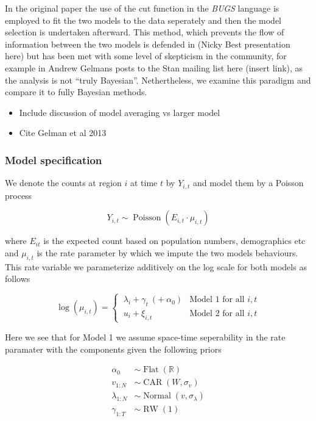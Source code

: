 \documentclass{report}
\begin{document}
In the original paper \cite{baystdetect} the use of the cut function in the \emph{BUGS} language is employed to fit the two models to the data seperately and then the model selection is undertaken afterward. This method, which prevents the flow of information between the two models is defended in (Nicky Best presentation here) but has been met with some level of skepticism in the community, for example in Andrew Gelmans posts to the Stan mailing list here (insert link), as the analysis is not ``truly Bayesian''. Nethertheless, we examine this paradigm and compare it to fully Bayesian methods. 

\begin{itemize}
\item Include discussion of model averaging vs larger model
\item Cite Gelman et al 2013
\end{itemize}

\subsubsection{Model specification}

We denote the counts at region $i$ at time $t$ by $Y_{i,t}$ and model them by a Poisson process

\begin{equation}
Y_{i,t} \sim \operatorname{Poisson}(E_{i,t} \cdot \mu_{i,t})
\end{equation}

where $E_{it}$ is the expected count based on population numbers, demographics etc and $\mu_{i,t}$ is the rate parameter by which we impute the two models behaviours. This rate variable we parameterize additively on the log scale for both models as follows

\begin{equation}
\log{(\mu_{i,t})} = \begin{cases}
\ \lambda_{i} + \gamma_{t} \  (+ \  \alpha_0) & \textrm{Model 1 for all } i, t \\
\ u_{i} + \xi_{i,t} & \textrm{Model 2 for all } i, t
\end{cases}
\end{equation} 

Here we see that for Model 1 we assume space-time seperability in the rate paramater with the components given the following priors

\begin{align}
\alpha_0 &\sim \operatorname{Flat}(\mathbb{R}) \\
v_{1:N} &\sim \operatorname{CAR}(W, \sigma_v) \\
\lambda_{1:N} &\sim \operatorname{Normal}(v, \sigma_\lambda) \\
\gamma_{1:T} &\sim \operatorname{RW}(1)
\end{align}
\end{document}
